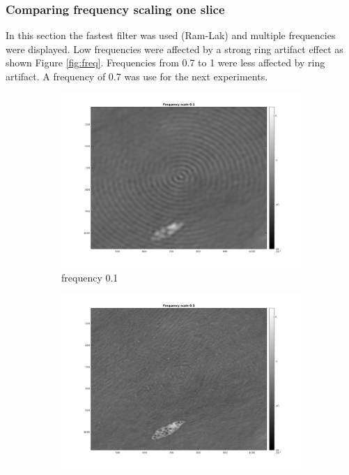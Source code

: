 \documentclass[10pt,a4paper,titlepage]{article}
\begin{document}
	\clearpage
	
	
	
	
	
	\subsubsection{Comparing frequency scaling one slice}
			In this section the fastest filter was used (Ram-Lak) and multiple frequencies were displayed. Low frequencies were affected by a strong ring artifact effect as shown Figure \ref{fig:freq}. Frequencies from 0.7 to 1 were less affected by ring artifact. A frequency of 0.7 was use for the next experiments. 
			
			\begin{figure}[h!]
        \centering	
			\begin{subfigure}[b]{0.475\textwidth}
            \centering
            \includegraphics[width=\textwidth]{freq/zoomed/f001.png}  
            \caption{frequency 0.1} 
            \label{freq01}
        \end{subfigure}
        \hfill
        \begin{subfigure}[b]{0.475\textwidth}  
            \centering 
            \includegraphics[width=\textwidth]{freq/zoomed/f005.png}   

\end{subfigure}
\end{figure}
\end{document}
